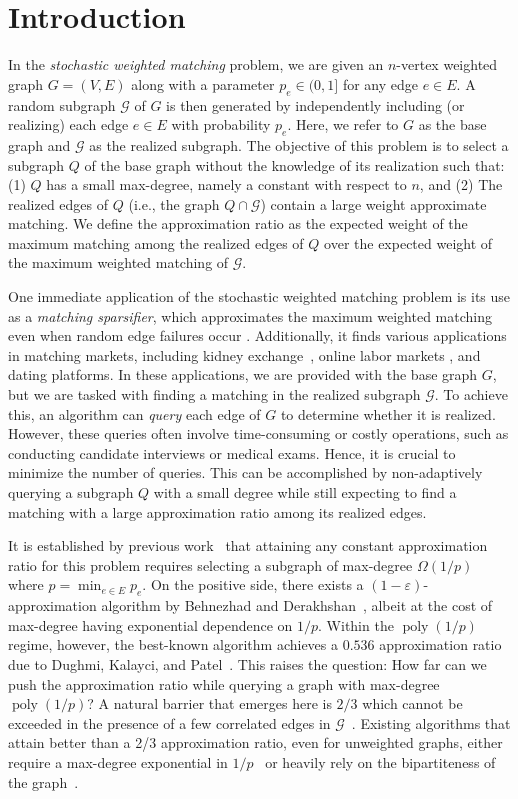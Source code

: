 \documentclass[letterpaper,11pt]{article}
\renewcommand{\epsilon}{\varepsilon}
\newcommand{\mc}[1]{\ensuremath{\mathcal{#1}}}
\DeclareMathOperator{\poly}{poly}
\renewcommand{\epsilon}[0]{\ensuremath{\varepsilon}}
\renewcommand{\mc}[1]{\ensuremath{\mathcal{#1}}}
\begin{document}
\section{Introduction}
In the {\em stochastic weighted  matching} problem, we are given an $n$-vertex weighted graph $G=(V, E)$ along with a parameter $p_e \in (0, 1]$ for any edge $e\in  E$. A random subgraph $\mc{G}$ of $G$ is then generated by independently including (or realizing) each edge $e \in E$ with  probability  $p_e$. Here, we refer to $G$ as the base graph and $\mc{G}$ as the realized subgraph. 
The objective of this problem is to select a subgraph $Q$ of the base graph without the knowledge of its realization  such that: (1) $Q$ has a small max-degree, namely a constant with respect to $n$, and (2) The realized edges of $Q$ (i.e., the graph $Q \cap \mc{G}$) contain a large weight approximate matching.
We define the approximation ratio as the expected weight of the maximum matching among the realized edges of $Q$ over the expected weight of the maximum weighted matching of $\mc{G}$. 

One immediate application of the stochastic weighted matching problem is its use as a {\em matching sparsifier}, which approximates the maximum weighted matching even when random edge failures occur \cite{sosa19}. Additionally, it finds various applications in matching markets, including kidney exchange~\cite{blumetal}, online labor markets \cite{soda19, BR18}, and dating platforms. In these applications, 
we are  provided with the base graph $G$, but we are tasked with finding a matching in the realized subgraph $\mc{G}$. To achieve this, an algorithm can {\em query} each edge of $G$ to determine whether it is realized. However, these queries often involve time-consuming or costly operations, such as conducting candidate interviews or medical exams. Hence, it is crucial to minimize the number of queries. This can be accomplished by non-adaptively querying a subgraph $Q$ with a small degree while still expecting to find a matching with a large approximation ratio among its realized edges.


It is established by previous work~\cite{AKL16} that attaining any constant approximation ratio for this problem requires selecting a subgraph of max-degree $\Omega(1/p)$ where $p=\min_{e\in E} p_e$. On the positive side, there  exists a $(1-\epsilon)$-approximation algorithm by Behnezhad and Derakhshan~\cite{behnezhad2020stochastic},  albeit at the cost of max-degree having exponential dependence on $1/p$.
Within the $\poly(1/p)$  regime, however, the best-known algorithm  achieves a $0.536$ approximation ratio due to Dughmi, Kalayci, and Patel~\cite{DughmiKP23}.  This raises the question: How far can we push the approximation ratio while querying a graph with max-degree $\poly(1/p)$? A natural barrier that emerges here is  $2/3$ which cannot be exceeded in the presence of a few correlated edges in $\mc{G}$~\cite{AKL16, stoc20}.  Existing algorithms that attain better than a 2/3 approximation ratio, even for unweighted graphs, either require a max-degree exponential in $1/p$~\cite{stoc20} or heavily rely on the bipartiteness of the graph~\cite{behnezhad2022stochastic}. 
\end{document}
